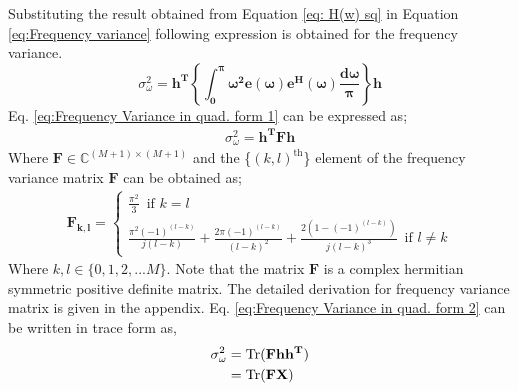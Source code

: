 Substituting the result obtained from Equation \ref{eq: H(w) sq} in Equation \ref{eq:Frequency variance} following expression is obtained for the frequency variance.
\begin{equation}
\label{eq:Frequency Variance in quad. form 1}
\sigma_{\omega}^{2}=\mathbf{h^{T}\left\{ \int_{0}^{\pi}\omega^{2}e(\omega)e^{H}(\omega)\frac{d\omega}{\pi}\right\} h}
\end{equation}
Eq. \ref{eq:Frequency Variance in quad. form 1} can be expressed as;
\begin{eqnarray}
\label{eq:Frequency Variance in quad. form 2}
\sigma_{\omega}^{2} = \mathbf{h^TFh}
\end{eqnarray}
Where $ \mathbf{F} \in {\mathbb{C}^{(M + 1) \times (M + 1)}}$ and the \{$(k,l)^\text{th}$\} element of the frequency variance matrix $\mathbf{F}$ can be obtained as;
 \begin{eqnarray}
 \label{Freq. Var. matrix}
 \mathbf{F_{k,l}} =  \begin{cases}
 \frac{\pi^2}{3}\,\,\, \text{if}\,\, k=l \\ 
 \frac{\pi^2{(-1)^{(l-k)}}}{j(l-k)} + \frac{2\pi{(-1)^{(l-k)}}}{(l-k)^2} + \frac{2\left(1 - {(-1)^{(l-k)}}\right)}{j{(l-k)^3}}\,\,\, \text{if}\,\, l \neq k
 \end{cases}
 \end{eqnarray}
 Where ${k,l} \in \{0,1,2,...M\}$. Note that the matrix $\mathbf{F}$ is a complex hermitian symmetric positive definite matrix. The detailed derivation for frequency variance matrix is given in the appendix. Eq. \ref{eq:Frequency Variance in quad. form 2} can be written in trace form as,
 \begin{eqnarray}
 \label{eq: Freq. Var. in trace form}
 \begin{aligned}
 \sigma_{\omega}^{2} &= \operatorname{Tr}({\mathbf{Fhh^T}})\\
 					 &=	\operatorname{Tr}({\mathbf{FX}})
 \end{aligned}
  \end{eqnarray}
